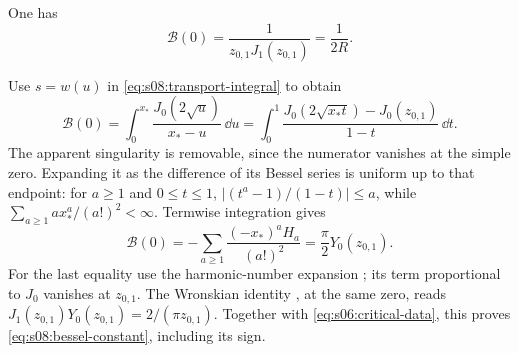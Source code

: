 \begin{lmm}\label{lmm:s08:bessel-constant}
One has
\begin{equation}\label{eq:s08:bessel-constant}
 \mathcal B(0)=\frac1{z_{0,1}J_1(z_{0,1})}=\frac1{2R}.
\end{equation}
\end{lmm}
\begin{prf}
Use $s=w(u)$ in \eqref{eq:s08:transport-integral} to obtain
\begin{equation}\label{eq:s08:bessel-integral}
 \mathcal B(0)=\int_0^{x_*}\frac{J_0(2\sqrt u)}{x_*-u}\,\dd u
 =\int_0^1\frac{J_0(2\sqrt{x_*t})-J_0(z_{0,1})}{1-t}\,\dd t.
\end{equation}
The apparent singularity is removable, since the numerator vanishes
at the simple zero. Expanding it as the difference of its Bessel
series is uniform up to that endpoint: for $a\geq1$ and
$0\leq t\leq1$, $|(t^a-1)/(1-t)|\leq a$, while
$\sum_{a\geq1}a x_*^a/(a!)^2<\infty$. Termwise integration gives
\begin{equation}\label{eq:s08:harmonic-sum}
 \mathcal B(0)=-\sum_{a\geq1}\frac{(-x_*)^aH_a}{(a!)^2}
                              =\frac\pi2Y_0(z_{0,1}).
\end{equation}
For the last equality use the harmonic-number expansion
\cite[(10.8.2)]{DLMF}; its term proportional to $J_0$ vanishes
at $z_{0,1}$. The Wronskian identity
\cite[(10.5.2)]{DLMF}, at the same zero, reads
$J_1(z_{0,1})Y_0(z_{0,1})=2/(\pi z_{0,1})$.
Together with \eqref{eq:s06:critical-data}, this proves
\eqref{eq:s08:bessel-constant}, including its sign.
\end{prf}
